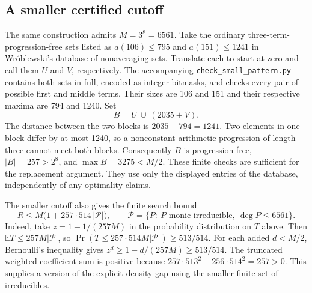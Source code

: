 \subsection*{A smaller certified cutoff}
The same construction admits $M=3^8=6561$. Take the ordinary three-term-progression-free sets listed
as $a(106)\le795$ and $a(151)\le1241$ in
\href{https://www.math.uni.wroc.pl/~jwr/non-ave/DATABASE.TXT}{Wróblewski's database of nonaveraging sets}.
Translate each to start at zero and call them $U$ and $V$, respectively.
The accompanying \texttt{check\_small\_pattern.py} contains both sets in full,
encoded as integer bitmasks, and checks every pair of possible first and middle terms.
Their sizes are 106 and 151 and their respective maxima are 794 and 1240. Set
\[
 B=U\ \cup\ (2035+V).
\]
The distance between the two blocks is $2035-794=1241$.
Two elements in one block differ by at most 1240, so a nonconstant arithmetic
progression of length three cannot meet both blocks. Consequently $B$ is
progression-free, $|B|=257>2^8$, and $\max B=3275<M/2$.
These finite checks are sufficient for the replacement argument. They use only
the displayed entries of the database, independently of any optimality claims.

The smaller cutoff also gives the finite search bound
\[
 R\le M\bigl(1+257\cdot514\,|\mathcal P|\bigr),
 \qquad \mathcal P=\{P:\ P\text{ monic irreducible},\ \deg P\le6561\}.
\]
Indeed, take $z=1-1/(257M)$ in the probability distribution on $T$ above.
Then $\mathbb E T\le257M|\mathcal P|$, so $\Pr(T\le257\cdot514M|\mathcal P|)
\ge513/514$. For each added $d<M/2$, Bernoulli's inequality gives
$z^d\ge1-d/(257M)\ge513/514$. The truncated weighted coefficient sum is
positive because $257\cdot513^2-256\cdot514^2=257>0$.
This supplies a version of the explicit density gap using the smaller finite
set of irreducibles.
